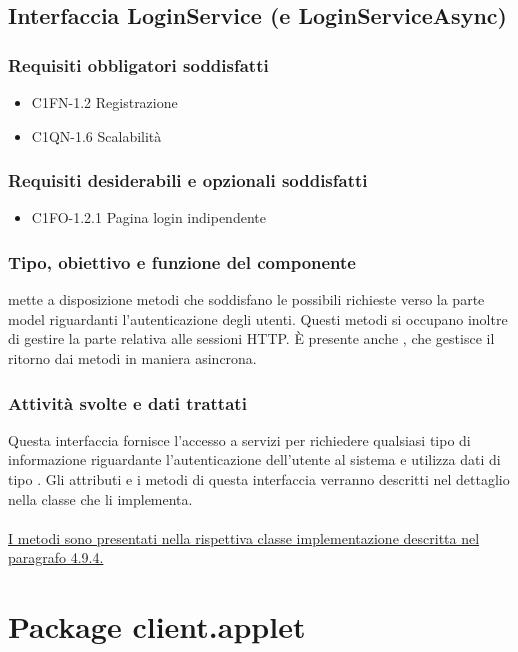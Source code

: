 \subsection{Interfaccia LoginService (e LoginServiceAsync)}
\subsubsection*{Requisiti obbligatori soddisfatti}
\begin{itemize}
	\item C1FN-1.2 Registrazione
	\item C1QN-1.6 Scalabilit\`a
\end{itemize}
\subsubsection*{Requisiti desiderabili e opzionali soddisfatti}
\begin{itemize}
    \item C1FO-1.2.1 Pagina login indipendente
\end{itemize}
\subsubsection*{Tipo, obiettivo e funzione del componente}
 mette a disposizione metodi
che soddisfano le possibili richieste verso la parte model riguardanti l'autenticazione degli utenti.
Questi metodi si occupano inoltre di gestire la parte relativa alle sessioni HTTP. 
\`E presente anche , che gestisce il ritorno dai
metodi in maniera asincrona.
\subsubsection*{Attivit\`a svolte e dati trattati}
Questa interfaccia fornisce l'accesso a servizi per richiedere qualsiasi tipo
di informazione riguardante l'autenticazione dell'utente al sistema
e utilizza dati di tipo .
Gli attributi e i metodi di questa interfaccia verranno descritti nel
dettaglio nella classe  che li implementa. \\\\
\underline{I metodi sono presentati nella rispettiva classe implementazione
descritta nel paragrafo 4.9.4.}


\newpage
\section{Package client.applet} %

